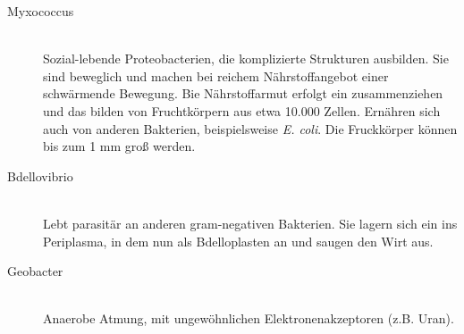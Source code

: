 \begin{enumerate}
		\begin{description} 
			\item[Myxococcus] \hfill \\
				Sozial-lebende Proteobacterien, die komplizierte Strukturen ausbilden.
				Sie sind beweglich und machen bei reichem Nährstoffangebot einer schwärmende Bewegung.
				Bie Nährstoffarmut erfolgt ein zusammenziehen und das bilden von Fruchtkörpern aus etwa 10.000 Zellen.
				Ernähren sich auch von anderen Bakterien, beispielsweise \emph{E. coli}.
				Die Fruckkörper können bis zum 1 mm  groß werden.
			\item[Bdellovibrio] \hfill \\
				Lebt parasitär an anderen gram-negativen Bakterien.
				Sie lagern sich ein ins Periplasma,
				in dem nun als Bdelloplasten an und saugen den Wirt aus.
			\item[Geobacter] \hfill \\
				Anaerobe Atmung, mit ungewöhnlichen Elektronenakzeptoren (z.B. Uran).
		\end{description}

\end{enumerate}

\newpage
